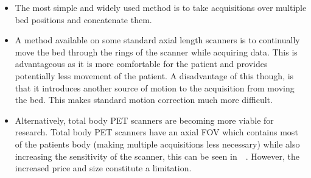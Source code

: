                 \begin{itemize}
                    \item The most simple and widely used method is to take acquisitions over multiple bed positions and concatenate them.
                    
                    \item A method available on some standard axial length scanners is to continually move the bed through the rings of the scanner while acquiring data. This is advantageous as it is more comfortable for the patient and provides potentially less movement of the patient. %
                    A disadvantage of this though, is that it introduces another source of motion to the acquisition from moving the bed. This makes standard motion correction much more difficult.
                    
                    \item Alternatively, total body \gls{PET} scanners are becoming more viable for research. %
                    Total body \gls{PET} scanners have an axial \gls{FOV} which contains most of the patients body (making multiple acquisitions less necessary) while also increasing the sensitivity of the scanner, this can be seen in~~\parencite{Cherry2018}. However, the increased price and size constitute a limitation.
                \end{itemize}
            
